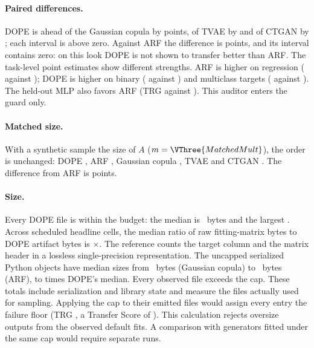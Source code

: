 \paragraph{Paired differences.}
DOPE is ahead of the Gaussian copula by  points, of TVAE by  and of CTGAN by ; each interval is above zero.
Against ARF the difference is  points, and its interval contains zero: on this look DOPE is not shown to transfer better than ARF.
The task-level point estimates show different strengths.
ARF is higher on regression ( against ); DOPE is higher on binary ( against ) and multiclass targets ( against ).
The held-out MLP also favors ARF (TRG  against ). This auditor enters the guard only.

\paragraph{Matched size.}
With a synthetic sample the size of $A$ ($m=\VThree{MatchedMult}$), the order is unchanged: DOPE , ARF , Gaussian copula , TVAE  and CTGAN .
The difference from ARF is  points.

\paragraph{Size.}
Every DOPE file is within the budget: the median is ~bytes and the largest .
Across scheduled headline cells, the median ratio of raw fitting-matrix bytes to DOPE artifact bytes is $\times$. The reference counts the target column and the matrix header in a lossless single-precision representation.
The uncapped serialized Python objects have median sizes from ~bytes (Gaussian copula) to ~bytes (ARF),  to  times DOPE's median. Every observed file exceeds the cap. These totals include serialization and library state and measure the files actually used for sampling.
Applying the cap to their emitted files would assign every entry the failure floor (TRG , a Transfer Score of ). This calculation rejects oversize outputs from the observed default fits. A comparison with generators fitted under the same cap would require separate runs.

